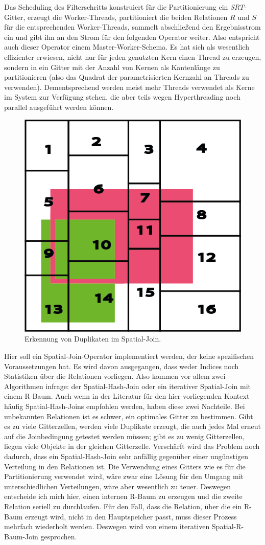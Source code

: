 \documentclass[a4paper,12pt,twoside]{article}
\newcommand{\Fb}[1]{\textit{#1}} %
\begin{document}
Das Scheduling des Filterschritts konstruiert für die Partitionierung ein \Fb{SRT}-Gitter, erzeugt die Worker-Threads, partitioniert die beiden Relationen $R$ und $S$ für die entsprechenden Worker-Threads, sammelt abschließend den Ergebnisstrom ein und gibt ihn an den Strom für den folgenden Operator weiter. Also entspricht auch dieser Operator einem Master-Worker-Schema. Es hat sich als wesentlich effizienter erwiesen, nicht nur für jeden genutzten Kern einen Thread zu erzeugen, sondern in ein Gitter mit der Anzahl von Kernen als Kantenlänge zu partitionieren (also das Quadrat der parametrisierten Kernzahl an Threads zu verwenden). Dementsprechend werden meist mehr Threads verwendet als Kerne im System zur Verfügung stehen, die aber teils wegen Hyperthreading noch parallel ausgeführt werden können.

\begin{figure}
	\centering
	\includegraphics[width=0.4\linewidth]{Bilder/duplikat.png}
	\caption{Erkennung von Duplikaten im Spatial-Join.}
	\label{img:sjDup}
\end{figure}

Hier soll ein Spatial-Join-Operator implementiert werden, der keine spezifischen Voraussetzungen hat. Es wird davon ausgegangen, dass weder Indices noch Statistiken über die Relationen vorliegen. Also kommen vor allem zwei Algorithmen infrage: der Spatial-Hash-Join oder ein iterativer Spatial-Join mit einem R-Baum. Auch wenn in der Literatur für den hier vorliegenden Kontext häufig Spatial-Hash-Joins empfohlen werden, haben diese zwei Nachteile. Bei unbekannten Relationen ist es schwer, ein optimales Gitter zu bestimmen. Gibt es zu viele Gitterzellen, werden viele Duplikate erzeugt, die auch jedes Mal erneut auf die Joinbedingung getestet werden müssen;  gibt es zu wenig Gitterzellen, liegen viele Objekte in der gleichen Gitterzelle. Verschärft wird das Problem noch dadurch, dass ein Spatial-Hash-Join sehr anfällig gegenüber einer ungünstigen Verteilung in den Relationen ist. Die Verwendung eines Gitters wie es für die Partitionierung verwendet wird, wäre zwar eine Lösung für den Umgang mit unterschiedlichen Verteilungen, wäre aber wesentlich zu teuer. Deswegen entscheide ich mich hier, einen internen R-Baum zu erzeugen und die zweite Relation seriell zu durchlaufen. Für den Fall, dass die Relation, über die ein R-Baum erzeugt wird, nicht in den Hauptspeicher passt, muss dieser Prozess mehrfach wiederholt werden. Deswegen wird von einem iterativen Spatial-R-Baum-Join gesprochen.
\end{document}
